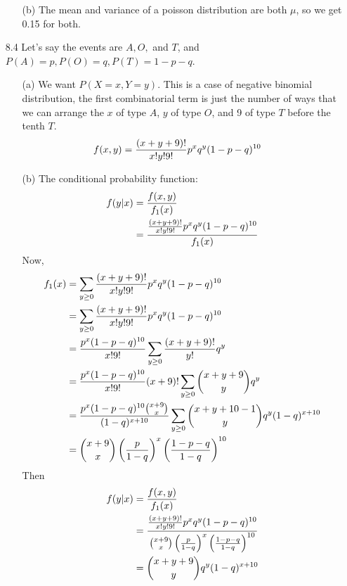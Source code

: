 \documentclass[english, 11pt]{article}
\begin{document}
\begin{itemize}
\begin{itemize}
      \item[(b)] The mean and variance of a poisson distribution are both $\mu$, so we get 0.15 for both.
    \end{itemize}

    \item[8.4] Let's say the events are $A, O,$ and $T$, and $P(A)= p, P(O) = q, P(T) = 1 - p -q$.
    \begin{itemize}
      \item[(a)] We want $P(X = x, Y = y)$. This is a case of negative binomial distribution, the first combinatorial term is just the number of ways that we can arrange the $x$ of type $A$, $y$ of type $O$, and 9 of type $T$ before the tenth $T$.
      \begin{align*}
        f(x,y) & = \frac{(x+y+9)!}{x!y!9!}p^xq^y(1-p-q)^{10}
      \end{align*}
      \item[(b)] The conditional probability function:
      \begin{align*}
        f(y|x) & = \frac{f(x,y)}{f_1(x)} \\
               & = \frac{\frac{(x+y+9)!}{x!y!9!}p^xq^y(1-p-q)^{10}}{f_1(x)}
      \end{align*}
      Now,
      \begin{align*}
        f_1(x) & = \sum_{y \geq 0}\frac{(x+y+9)!}{x!y!9!}p^xq^y(1-p-q)^{10} \\
               & = \sum_{y \geq 0} \frac{(x+y+9)!}{x!y!9!}p^xq^y(1-p-q)^{10} \\
               & = \frac{p^x(1-p-q)^{10}}{x!9!} \sum_{y \geq 0} \frac{(x+y+9)!}{y!}q^y \\
               & = \frac{p^x(1-p-q)^{10}}{x!9!} (x+9)! \sum_{y \geq 0} {x+y+9 \choose y} q^y \\
               & = \frac{p^x(1-p-q)^{10}{x+9 \choose x}}{(1-q)^{x+10}} \sum_{y \geq 0} {x+y+10 -1 \choose y} q^y(1-q)^{x + 10} \\
               & = {x+9 \choose x} \left( \frac{p}{1-q} \right)^x \left( \frac{1-p-q}{1-q} \right)^{10}
      \end{align*}
      Then
      \begin{align*}
        f(y|x) & = \frac{f(x,y)}{f_1(x)} \\
               & = \frac{\frac{(x+y+9)!}{x!y!9!}p^xq^y(1-p-q)^{10}}{{x+9 \choose x} \left( \frac{p}{1-q} \right)^x \left( \frac{1-p-q}{1-q} \right)^{10}} \\
               & = {x+y+9 \choose y}q^y(1-q)^{x+10}
      \end{align*}
    \end{itemize}


\end{itemize}
\end{document}

